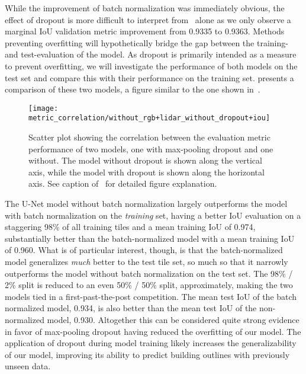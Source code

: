 While the improvement of batch normalization was immediately obvious, the effect of dropout is more difficult to interpret from~ alone as we only observe a marginal IoU validation metric improvement from \num{0.9335} to \num{0.9363}.
Methods preventing overfitting will hypothetically bridge the gap between the training- and test-evaluation of the model.
As dropout is primarily intended as a measure to prevent overfitting, we will investigate the performance of both models on the test set and compare this with their performance on the training set.
 presents a comparison of these two models, a figure similar to the one shown in~.

\begin{figure}[H]
  \centering
  \texttt{[image: metric\_correlation/without\_rgb+lidar\_without\_dropout+iou]}
  \caption{%
    Scatter plot showing the correlation between the evaluation metric performance of two models, one with max-pooling dropout and one without.
    The model without dropout is shown along the vertical axis, while the model with dropout is shown along the horizontal axis.
    See caption of~ for detailed figure explanation.
  }%
  \label{fig:dropout-train-test}
\end{figure}

The U-Net model without batch normalization largely outperforms the model with batch normalization on the \emph{training} set, having a better IoU evaluation on a staggering 98\% of all training tiles and a mean training IoU of \num{0.974}, substantially better than the batch-normalized model with a mean training IoU of \num{0.960}.
What is of particular interest, though, is that the batch-normalized model generalizes \emph{much} better to the test tile set, so much so that it narrowly outperforms the model without batch normalization on the test set.
The 98\% / 2\% split is reduced to an even 50\% / 50\% split, approximately, making the two models tied in a first-past-the-post competition.
The mean test IoU of the batch normalized model, \num{0.934}, is also better than the mean test IoU of the non-normalized model, \num{0.930}.
Altogether this can be considered quite strong evidence in favor of max-pooling dropout having reduced the overfitting of our model.
The application of dropout during model training likely increases the generalizability of our model, improving its ability to predict building outlines with previously unseen data.

